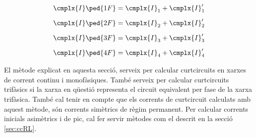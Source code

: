 \begin{subequations}
\begin{align}
	\cmplx{I}\ped{1F} &= \cmplx{I}_1 + \cmplx{I}_1' \\[0.5em]
	\cmplx{I}\ped{2F} &= \cmplx{I}_2 + \cmplx{I}_2' \\[0.5em]
	\cmplx{I}\ped{3F} &= \cmplx{I}_3 + \cmplx{I}_3' \\[0.5em]
	\cmplx{I}\ped{4F} &= \cmplx{I}_4 + \cmplx{I}_4' 
\end{align}
\end{subequations}
	
El mètode  explicat en aquesta secció, serveix per calcular curtcircuits en xarxes de corrent continu i monofàsiques. També serveix per calcular curtcircuits trifàsics si la xarxa en qüestió representa el circuit equivalent per fase de la xarxa trifàsica. També cal tenir en compte que els corrents de curtcircuit calculats amb aquest mètode, són corrents simètrics de règim permanent. Per calcular corrents inicials asimètrics i de pic, cal fer servir mètodes com el descrit en la secció \vref{sec:ccRL}.

